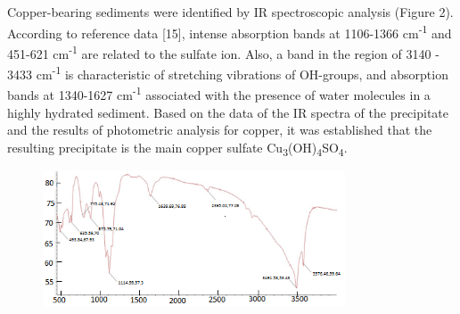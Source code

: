 % 

Copper-bearing sediments were identified by IR spectroscopic analysis
(Figure 2). According to reference data {[}15{]}, intense absorption
bands at 1106-1366 cm\textsuperscript{-1} and 451-621
cm\textsuperscript{-1} are related to the sulfate ion. Also, a band in
the region of 3140 - 3433 cm\textsuperscript{-1} is characteristic of
stretching vibrations of OH-groups, and absorption bands at 1340-1627
cm\textsuperscript{-1} associated with the presence of water molecules
in a highly hydrated sediment. Based on the data of the IR spectra of
the precipitate and the results of photometric analysis for copper, it
was established that the resulting precipitate is the main copper
sulfate Cu\textsubscript{3}(OH)\textsubscript{4}SO\textsubscript{4}.

\begin{figure}[H]
	\centering
	\includegraphics[width=0.8\textwidth]{media/chem2/image18}
	\caption*{}
\end{figure}


